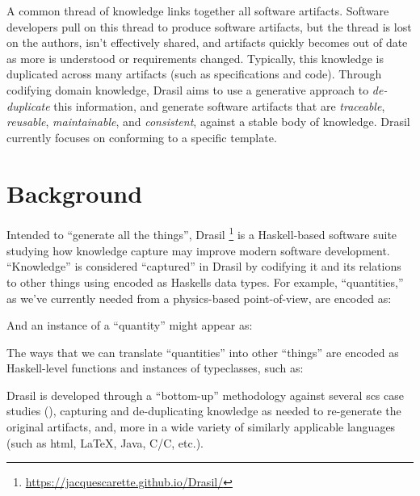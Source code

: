       A common thread of knowledge links together all software artifacts.
      Software developers pull on this thread to produce software artifacts, but
      the thread is lost on the authors, isn't effectively shared, and artifacts
      quickly becomes out of date as more is understood or requirements changed.
      Typically, this knowledge is duplicated across many artifacts (such as
      specifications and code). Through codifying domain knowledge,
      Drasil\cite{Drasil2021} aims to use a generative approach to
      \textit{de-duplicate} this information, and generate software artifacts
      that are \textit{traceable}, \textit{reusable}, \textit{maintainable}, and
      \textit{consistent}, against a stable body of knowledge. Drasil currently
      focuses on  conforming to a specific 
      template\cite{SmithAndLai2005}.
\fi

\section{Background}
\label{sec:intro:background}


Intended to ``generate all the things''\footnotemark{}, Drasil
\footnote{\url{https://jacquescarette.github.io/Drasil/}} is a Haskell-based
\cite{Haskell2010} software suite studying how knowledge capture may improve
modern software development. ``Knowledge'' is considered ``captured'' in Drasil
by codifying it and its relations to other things using  encoded as
Haskells data types. For example, ``quantities,'' as we've currently needed from
a physics-based point-of-view, are encoded as:


And an instance of a ``quantity'' might appear as:


The ways that we can translate ``quantities'' into other ``things'' are encoded
as Haskell-level functions and instances of typeclasses, such as:


Drasil is developed through a ``bottom-up'' methodology against several
\acs{scs} case studies (), capturing and de-duplicating
knowledge as needed to re-generate the original artifacts, and, more in a wide
variety of similarly applicable languages (such as \acs{html}, \LaTeX{}, Java,
C/C\+\+, etc.).


